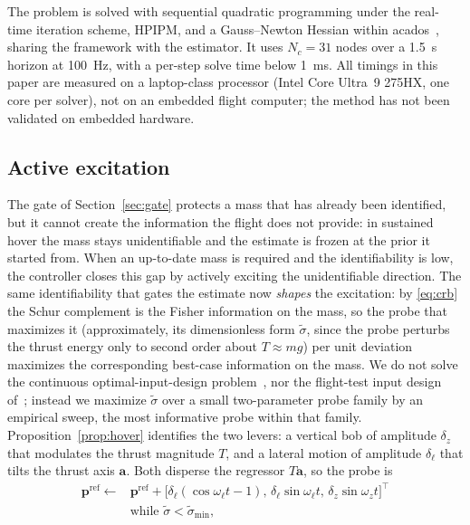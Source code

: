 \documentclass{ieeeaccess}
\newcommand{\vect}[1]{\bm{#1}}
\begin{document}
The problem is solved with sequential quadratic programming under the real-time
iteration scheme, HPIPM, and a Gauss--Newton Hessian within
acados~\cite{verschueren2022acados}, sharing the framework with the estimator. It
uses $N_c=31$ nodes over a \SI{1.5}{\second} horizon at \SI{100}{\hertz}, with a
per-step solve time below \SI{1}{\milli\second}. All timings in this paper are
measured on a laptop-class processor (Intel Core Ultra~9 275HX, one core per
solver), not on an embedded flight computer; the method has not been validated
on embedded hardware.

\subsection{Active excitation}\label{sec:active}
The gate of Section~\ref{sec:gate} protects a mass that has already been
identified, but it cannot create the information the flight does not provide:
in sustained hover the mass stays unidentifiable and the estimate is frozen at
the prior it started from. When an up-to-date mass is required and the
identifiability is low, the controller closes this gap by actively exciting the
unidentifiable direction. The same identifiability that gates the estimate now
\emph{shapes} the excitation: by \eqref{eq:crb} the Schur complement is the Fisher
information on the mass, so the probe that maximizes it (approximately, its
dimensionless form $\tilde\sigma$, since the probe perturbs the thrust energy
only to second order about $T\approx mg$) per unit deviation
maximizes the corresponding best-case information on the mass. We do not solve the continuous
optimal-input-design problem~\cite{mehra1974optimal}, nor the flight-test
input design of~\cite{morelli2022inertia}; instead we maximize
$\tilde\sigma$ over a small two-parameter probe family by an empirical sweep, the
most informative probe within that family. Proposition~\ref{prop:hover}
identifies the two levers: a vertical bob of amplitude $\delta_z$ that modulates the
thrust magnitude $T$, and a lateral motion of amplitude $\delta_\ell$ that tilts the
thrust axis $\vect{a}$. Both disperse the regressor $T\vect{a}$, so the probe is
\begin{equation}
\begin{aligned}
\vect{p}^{\text{ref}}\leftarrow{}&\vect{p}^{\text{ref}}+
\big[\delta_\ell(\cos\omega_\ell t-1),\,\delta_\ell\sin\omega_\ell t,\,\delta_z\sin\omega_z t\big]^{\!\top}\\
&\text{while }\tilde\sigma<\tilde\sigma_{\min},
\end{aligned}
\label{eq:probe}
\end{equation}
\end{document}
